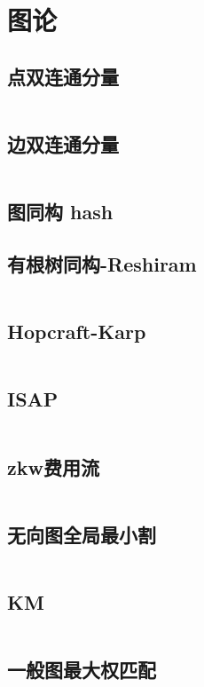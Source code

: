 \twocolumn
\chapter{图论}
\section{点双连通分量}
\inputminted{cpp}{./graph-theory/vertex-biconnected-component.cpp}
\section{边双连通分量}
\inputminted{cpp}{./graph-theory/edge-biconnected-component.cpp}
\section{图同构 hash}

\section{有根树同构-Reshiram}
\inputminted{cpp}{./graph-theory/rooted-tree-isomorphism-Reshiram.cpp}
\section{Hopcraft-Karp}
\inputminted{cpp}{./graph-theory/Hopcraft-Karp.cpp}
\section{ISAP}
\inputminted{cpp}{./graph-theory/ISAP-maximum-flow.cpp}
\section{zkw费用流}
\inputminted{cpp}{./graph-theory/zkw-cost-flow.cpp}
\section{无向图全局最小割}
\inputminted{cpp}{./graph-theory/StoerWagner.cpp}
\section{KM}
\inputminted{cpp}{./graph-theory/KM-Algorithm.cpp}
\section{一般图最大权匹配}
\inputminted{cpp}{./graph-theory/general-graph-maximum-weight-matching.cpp}
